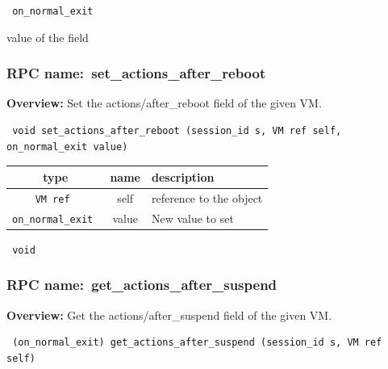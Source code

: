 \vspace{0.3cm}

{\tt 
on\_normal\_exit
}


value of the field
\vspace{0.3cm}
\vspace{0.3cm}
\vspace{0.3cm}
\subsubsection{RPC name:~set\_actions\_after\_reboot}

{\bf Overview:} 
Set the actions/after\_reboot field of the given VM.

\begin{verbatim} void set_actions_after_reboot (session_id s, VM ref self, on_normal_exit value)\end{verbatim}



 
\vspace{0.3cm}
\begin{tabular}{|c|c|p{7cm}|}
 \hline
{\bf type} & {\bf name} & {\bf description} \\ \hline
{\tt VM ref } & self & reference to the object \\ \hline 

{\tt on\_normal\_exit } & value & New value to set \\ \hline 

\end{tabular}

\vspace{0.3cm}

{\tt 
void
}



\vspace{0.3cm}
\vspace{0.3cm}
\vspace{0.3cm}
\subsubsection{RPC name:~get\_actions\_after\_suspend}

{\bf Overview:} 
Get the actions/after\_suspend field of the given VM.

\begin{verbatim} (on_normal_exit) get_actions_after_suspend (session_id s, VM ref self)\end{verbatim}


